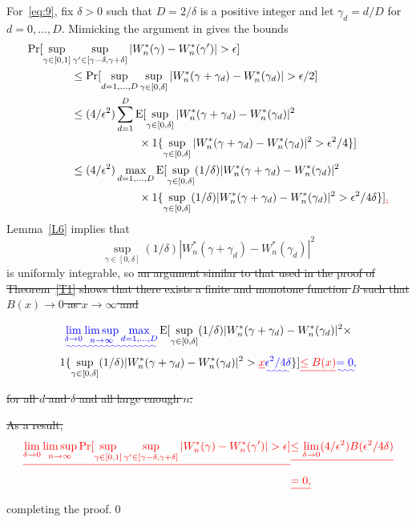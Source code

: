 \documentclass[11pt]{article}
\providecommand{\DIFadd}[1]{{\protect\color{blue}\uwave{#1}}} %
\providecommand{\DIFdel}[1]{{\protect\color{red}\sout{#1}}}                      %
\providecommand{\DIFaddbegin}{} %
\providecommand{\DIFaddend}{} %
\providecommand{\DIFdelbegin}{} %
\providecommand{\DIFdelend}{} %
\begin{document}
For~\eqref{eq:9}, fix $\delta> 0$ such that $D = 2/\delta$ is a
positive integer and let $\gamma_d = d/D$ for $d =
0,\dots,D$. Mimicking the argument in \cite{JoD:00b} gives the bounds
\begin{align*}
  \pr[\sup_{\gamma \in [0,1]} &
  \sup_{\gamma' \in [\gamma - \delta, \gamma + \delta]}
  | W_n^{*}(\gamma) - W_n^{*}(\gamma') | > \epsilon] \\
  &\leq \pr[ \sup_{d = 1,\dots,D} \sup_{\gamma \in [0,\delta]}
  | W_n^{*}(\gamma + \gamma_d) - W_n^{*}(\gamma_d) | > \epsilon/2] \\
  &\leq  (4/\epsilon^2) \sum_{d=1}^D \E[\sup_{\gamma \in [0,\delta]}
  | W_n^{*}(\gamma + \gamma_d) - W_n^{*}(\gamma_d) |^2 \\
  &\qquad\qquad\qquad \times \ind\{\sup_{\gamma \in [0,\delta]}
  | W_n^{*}(\gamma + \gamma_d) - W_n^{*}(\gamma_d) |^2 > \epsilon^2/4\}] \\
  &\leq  (4/\epsilon^2) \max_{d=1,\dots,D} \E[\sup_{\gamma \in [0,\delta]}
  (1/\delta) | W_n^{*}(\gamma + \gamma_d) - W_n^{*}(\gamma_d) |^2 \\
  &\qquad\qquad\qquad \times \ind\{\sup_{\gamma \in [0,\delta]}
  (1/\delta) | W_n^{*}(\gamma + \gamma_d) - W_n^{*}(\gamma_d) |^2 > \epsilon^2/4\delta\}]
  \DIFdelbegin \DIFdel{.} \DIFdelend
\end{align*}
\DIFadd{for large enough $n$.}
Lemma~\ref{L6} implies that
\begin{equation*}
  \sup_{\gamma \in [0,\delta]}
  (1/\delta) | W_n^{*}(\gamma + \gamma_d) - W_n^{*}(\gamma_d) |^2
\end{equation*}
is uniformly integrable, so
\DIFdel{an argument similar to that used in the
proof of Theorem~\ref{T1} shows that there exists a
finite and monotone function $B$ such that $B(x) \to 0$ as
$x \to \infty$ and}
\DIFaddbegin
\begin{multline*}
  \DIFadd{\lim_{\delta \to 0} \limsup_{n\to\infty} \max_{d=1,\dots,D}}
  \E[ \sup_{\gamma \in [0,\delta]}
  (1/\delta) | W_n^{*}(\gamma + \gamma_d) - W_n^{*}(\gamma_d) |^2 \times \\
  \ind\{\sup_{\gamma \in [0,\delta]}
  (1/\delta) | W_n^{*}(\gamma + \gamma_d) - W_n^{*}(\gamma_d) |^2 > \DIFdel{x}
  \DIFadd{\epsilon^2/4\delta} \}]
  \DIFdel { \leq B(x) } \DIFadd { = 0, }
\end{multline*}
\DIFaddend
\DIFdel{for all $d$ and $\delta$ and all large enough $n$.}

\DIFdel{As a result, }\begin{align*}
  \DIFdel{\lim_{\delta \to 0} \limsup_{n\to\infty} \pr [ \sup_{\gamma \in [0,1]}
  \sup_{\gamma' \in [\gamma - \delta, \gamma + \delta]}
  | W_n^{*}(\gamma) - W_n^{*}(\gamma') | > \epsilon ]} & \DIFdel{\leq
  \lim_{\delta \to 0} (4/\epsilon^2)
  B(\epsilon^2/4\delta) }\\
  &\DIFdel{= 0,
}\end{align*}
completing the proof.\qed
\end{document}
